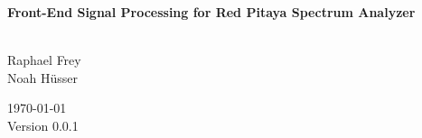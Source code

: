 \documentclass[a4paper,oneside]{alpenthesis/alpenthesis}
\begin{document}
%
%
\begin{titlingpage}
    \flushright\sffamily

    \vspace*{5em}
    
    \Huge\bfseries{Front-End Signal Processing for Red Pitaya Spectrum Analyzer}\\[1ex]
    \Large{}\\[3ex]

    \normalsize\mdseries

    \vfill
    Raphael Frey\\
    Noah H\"usser\\[3ex]

    \vspace{5em}

    \today\\
    Version 0.0.1
\end{titlingpage} %
%
%
\frontmatter

\renewcommand*\contentsname{Short Contents}
\setcounter{tocdepth}{0}
\tableofcontents*
\renewcommand*\contentsname{Contents}
\setcounter{tocdepth}{3}
\cleardoublepage
\tableofcontents*
\clearpage
\listoffigures*
\clearpage
\listoftables*
\clearpage
\listoflistings
\clearpage
%
%
\mainmatter
%
%

%
%
\end{document}
